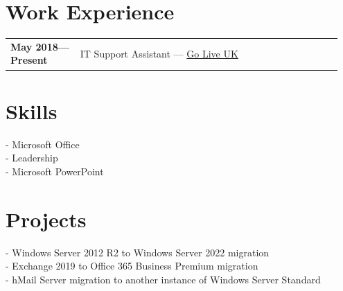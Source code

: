 \documentclass[letterpaper,10pt]{article}
\begin{document}
	\begin{minipage}[t]{0.5\textwidth}

		
		\section*{Work Experience}
		\begin{tabular}{@{}p{0.2\linewidth} p{0.75\linewidth}}
			\textbf{May 2018—Present} & IT Support Assistant — \href{https://www.goliveuk.com/}{Go Live UK} \\
		\end{tabular}
		
		\section*{Skills}
		
		- {Microsoft Office}\\
		- {Leadership}\\
		- {Microsoft PowerPoint}
		
		
		\section*{Projects}
		
		- Windows Server 2012 R2 to Windows Server 2022 migration\\
		- Exchange 2019 to Office 365 Business Premium migration\\
		- hMail Server migration to another instance of
			Windows Server Standard
		
		

\end{minipage}
\end{document}

